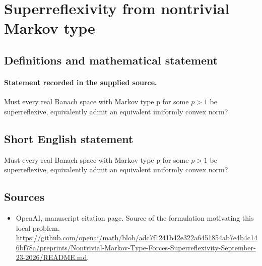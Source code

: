 \documentclass[11pt]{article}
\begin{document}
\section*{Superreflexivity from nontrivial Markov type}\label{statement}
\subsection{Definitions and mathematical statement}
\paragraph{Statement recorded in the supplied source.}
Must every real Banach space with Markov type p for some $p>1$ be superreflexive, equivalently admit an equivalent uniformly convex norm?
\subsection{Short English statement}
Must every real Banach space with Markov type p for some $p>1$ be superreflexive, equivalently admit an equivalent uniformly convex norm?
\subsection{Sources}
\begin{itemize}
\item[S1] OpenAI, manuscript citation page. Source of the formulation motivating this local problem.
\url{https://github.com/openai/math/blob/adc7f1241b42e322a6451854ab7e4b4c146bf78a/preprints/Nontrivial-Markov-Type-Forces-Superreflexivity-September-23-2026/README.md}.
\end{itemize}
\end{document}
